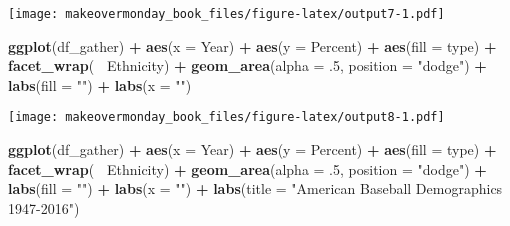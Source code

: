 \documentclass[]{book}
\newenvironment{Shaded}{\begin{snugshade}}{\end{snugshade}}
\newcommand{\KeywordTok}[1]{\textcolor[rgb]{0.13,0.29,0.53}{\textbf{#1}}}
\newcommand{\DataTypeTok}[1]{\textcolor[rgb]{0.13,0.29,0.53}{#1}}
\newcommand{\DecValTok}[1]{\textcolor[rgb]{0.00,0.00,0.81}{#1}}
\newcommand{\StringTok}[1]{\textcolor[rgb]{0.31,0.60,0.02}{#1}}
\newcommand{\OperatorTok}[1]{\textcolor[rgb]{0.81,0.36,0.00}{\textbf{#1}}}
\newcommand{\NormalTok}[1]{#1}
\theoremstyle{definition}
\theoremstyle{definition}
\theoremstyle{definition}
\theoremstyle{remark}
\begin{document}
\texttt{[image: makeovermonday\_book\_files/figure-latex/output7-1.pdf]}

\clearpage

\begin{Shaded}
\begin{Highlighting}[]
\KeywordTok{ggplot}\NormalTok{(df_gather) }\OperatorTok{+}
\StringTok{  }\KeywordTok{aes}\NormalTok{(}\DataTypeTok{x =}\NormalTok{ Year) }\OperatorTok{+}
\StringTok{  }\KeywordTok{aes}\NormalTok{(}\DataTypeTok{y =}\NormalTok{ Percent) }\OperatorTok{+}
\StringTok{  }\KeywordTok{aes}\NormalTok{(}\DataTypeTok{fill =}\NormalTok{ type) }\OperatorTok{+}
\StringTok{  }\KeywordTok{facet_wrap}\NormalTok{(}\OperatorTok{~}\StringTok{ }\NormalTok{Ethnicity) }\OperatorTok{+}
\StringTok{  }\KeywordTok{geom_area}\NormalTok{(}\DataTypeTok{alpha =}\NormalTok{ .}\DecValTok{5}\NormalTok{, }\DataTypeTok{position =} \StringTok{"dodge"}\NormalTok{) }\OperatorTok{+}
\StringTok{  }\KeywordTok{labs}\NormalTok{(}\DataTypeTok{fill =} \StringTok{""}\NormalTok{) }\OperatorTok{+}
\StringTok{  }\KeywordTok{labs}\NormalTok{(}\DataTypeTok{x =} \StringTok{""}\NormalTok{) }
\end{Highlighting}
\end{Shaded}

\texttt{[image: makeovermonday\_book\_files/figure-latex/output8-1.pdf]}

\clearpage

\begin{Shaded}
\begin{Highlighting}[]
\KeywordTok{ggplot}\NormalTok{(df_gather) }\OperatorTok{+}
\StringTok{  }\KeywordTok{aes}\NormalTok{(}\DataTypeTok{x =}\NormalTok{ Year) }\OperatorTok{+}
\StringTok{  }\KeywordTok{aes}\NormalTok{(}\DataTypeTok{y =}\NormalTok{ Percent) }\OperatorTok{+}
\StringTok{  }\KeywordTok{aes}\NormalTok{(}\DataTypeTok{fill =}\NormalTok{ type) }\OperatorTok{+}
\StringTok{  }\KeywordTok{facet_wrap}\NormalTok{(}\OperatorTok{~}\StringTok{ }\NormalTok{Ethnicity) }\OperatorTok{+}
\StringTok{  }\KeywordTok{geom_area}\NormalTok{(}\DataTypeTok{alpha =}\NormalTok{ .}\DecValTok{5}\NormalTok{, }\DataTypeTok{position =} \StringTok{"dodge"}\NormalTok{) }\OperatorTok{+}
\StringTok{  }\KeywordTok{labs}\NormalTok{(}\DataTypeTok{fill =} \StringTok{""}\NormalTok{) }\OperatorTok{+}
\StringTok{  }\KeywordTok{labs}\NormalTok{(}\DataTypeTok{x =} \StringTok{""}\NormalTok{) }\OperatorTok{+}
\StringTok{  }\KeywordTok{labs}\NormalTok{(}\DataTypeTok{title =} \StringTok{"American Baseball Demographics 1947-2016"}\NormalTok{) }
\end{Highlighting}
\end{Shaded}
\end{document}
